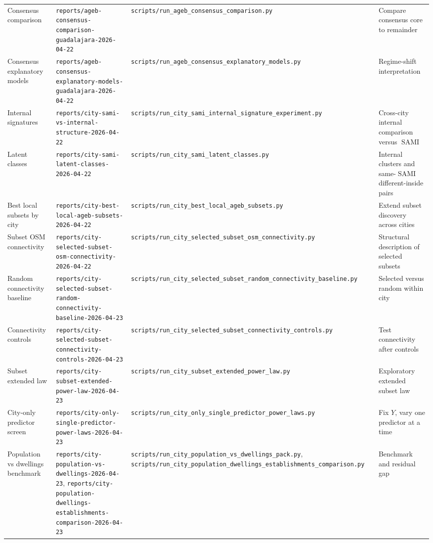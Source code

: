 \documentclass[11pt]{article}
\newcommand{\SAMI}{\operatorname{SAMI}}
\begin{document}
\begin{landscape}
\begin{longtable}{p{}p{}p{}p{}}
Consensus comparison & \texttt{reports/ageb-consensus-comparison-guadalajara-2026-04-22} & \texttt{scripts/run\_ageb\_consensus\_comparison.py} & Compare consensus core to remainder \\
Consensus explanatory models & \texttt{reports/ageb-consensus-explanatory-models-guadalajara-2026-04-22} & \texttt{scripts/run\_ageb\_consensus\_explanatory\_models.py} & Regime-shift interpretation \\
Internal signatures & \texttt{reports/city-sami-vs-internal-structure-2026-04-22} & \texttt{scripts/run\_city\_sami\_internal\_signature\_experiment.py} & Cross-city internal comparison versus \(\SAMI\) \\
Latent classes & \texttt{reports/city-sami-latent-classes-2026-04-22} & \texttt{scripts/run\_city\_sami\_latent\_classes.py} & Internal clusters and same-\(\SAMI\) different-inside pairs \\
Best local subsets by city & \texttt{reports/city-best-local-ageb-subsets-2026-04-22} & \texttt{scripts/run\_city\_best\_local\_ageb\_subsets.py} & Extend subset discovery across cities \\
Subset OSM connectivity & \texttt{reports/city-selected-subset-osm-connectivity-2026-04-22} & \texttt{scripts/run\_city\_selected\_subset\_osm\_connectivity.py} & Structural description of selected subsets \\
Random connectivity baseline & \texttt{reports/city-selected-subset-random-connectivity-baseline-2026-04-23} & \texttt{scripts/run\_city\_selected\_subset\_random\_connectivity\_baseline.py} & Selected versus random within city \\
Connectivity controls & \texttt{reports/city-selected-subset-connectivity-controls-2026-04-23} & \texttt{scripts/run\_city\_selected\_subset\_connectivity\_controls.py} & Test connectivity after controls \\
Subset extended law & \texttt{reports/city-subset-extended-power-law-2026-04-23} & \texttt{scripts/run\_city\_subset\_extended\_power\_law.py} & Exploratory extended subset law \\
City-only predictor screen & \texttt{reports/city-only-single-predictor-power-laws-2026-04-23} & \texttt{scripts/run\_city\_only\_single\_predictor\_power\_laws.py} & Fix \(Y\), vary one predictor at a time \\
Population vs dwellings benchmark & \texttt{reports/city-population-vs-dwellings-2026-04-23}, \texttt{reports/city-population-dwellings-establishments-comparison-2026-04-23} & \texttt{scripts/run\_city\_population\_vs\_dwellings\_pack.py}, \texttt{scripts/run\_city\_population\_dwellings\_establishments\_comparison.py} & Benchmark and residual gap \\

\end{longtable}
\end{landscape}
\end{document}
